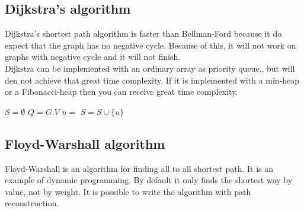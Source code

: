 \documentclass[a4paper, 10pt]{article}
\begin{document}
\begin{algorithmic}
\begin{algoritmic}
\State {}
\State {}
                \State {}
        \EndFor
\EndFor
\EndFunction
\end{algoritmic}

\subsection{Dijkstra's algorithm}
Dijkstra's shortest path algorithm is faster than Bellman-Ford because it do expect that the graph has no negative cycle. Because of this, it will not work on graphs with negative cycle and it will not finish. \\
Dijkstra can be implemented with an ordinary array as priority queue., but will den not achieve that great time complexity. If it is implemented with a min-heap or a Fibonacci-heap then you can receive great time complexity.
\\

\begin{algoritmic}
\State {}
\State $S = \emptyset$
\State $Q = G.V$
        \State $u = $ 
        \State $S = S \cup \{u\}$
                \State {}
        \EndFor
\EndWhile
\EndFunction

\end{algoritmic}

\subsection{Floyd-Warshall algorithm}
Floyd-Warshall is an algorithm for finding all to all shortest path. It is an example of dynamic programming. By default it only finds the shortest way by value, not by weight. It is possible to write the algorithm with path reconstruction.
\\

\end{algorithmic}
\end{document}
